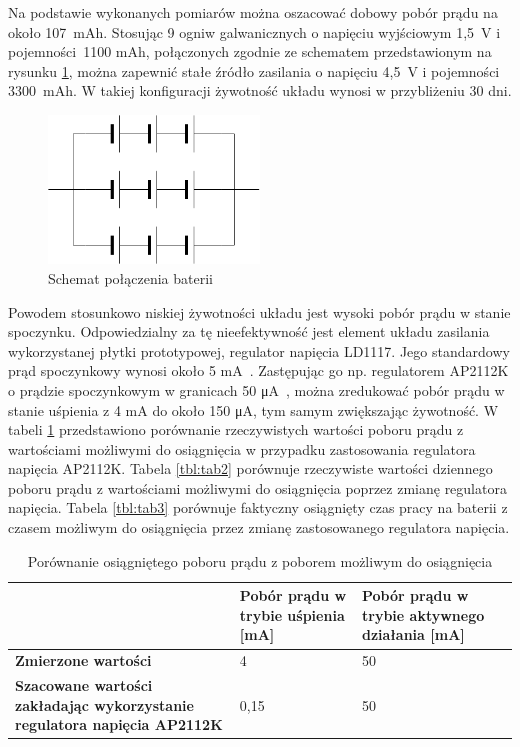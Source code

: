         Na podstawie wykonanych pomiarów można oszacować dobowy pobór prądu na około 107~mAh. Stosując 9 ogniw galwanicznych o napięciu wyjściowym 1,5~V i pojemności~1100 mAh, połączonych zgodnie ze schematem przedstawionym na rysunku \ref{fig:battery_layout}, można zapewnić stałe źródło zasilania o napięciu 4,5~V i pojemności 3300~mAh. W takiej konfiguracji żywotność układu wynosi w przybliżeniu 30 dni.

        \begin{figure}[]
            \centering
            \includegraphics[width=0.5\textwidth]{chapters/images/battery_layout.png}
            \caption{Schemat połączenia baterii}
            \label{fig:battery_layout}
        \end{figure}

        Powodem stosunkowo niskiej żywotności układu jest wysoki pobór prądu w stanie spoczynku. Odpowiedzialny za tę nieefektywność jest element układu zasilania wykorzystanej płytki prototypowej, regulator napięcia LD1117. Jego standardowy prąd spoczynkowy wynosi około 5 mA~\cite{AMS1117-ds}. Zastępując go np. regulatorem AP2112K o prądzie spoczynkowym w granicach 50 μA~\cite{AP2112K-ds}, można zredukować pobór prądu w stanie uśpienia z 4 mA do około 150 μA, tym samym zwiększając żywotność. W tabeli \ref{tbl:tab1} przedstawiono porównanie rzeczywistych wartości poboru prądu z wartościami możliwymi do osiągnięcia w przypadku zastosowania regulatora napięcia AP2112K. Tabela \ref{tbl:tab2} porównuje rzeczywiste wartości dziennego poboru prądu z wartościami możliwymi do osiągnięcia poprzez zmianę regulatora napięcia. Tabela \ref{tbl:tab3} porównuje faktyczny osiągnięty czas pracy na baterii z czasem możliwym do osiągnięcia przez zmianę zastosowanego regulatora napięcia.


        \begin{table}[]
            \caption{Porównanie osiągniętego poboru prądu z poborem możliwym do osiągnięcia}
            \centering
            \begin{tabular}{p{6cm}|p{4cm}|p{4cm} }
                    & \textbf{Pobór prądu w trybie uśpienia [mA]} & \textbf{Pobór prądu w trybie aktywnego działania [mA]} \\ \hline
             \textbf{Zmierzone wartości}
                      & 4 & 50 \\
            \hline
            \textbf{Szacowane wartości zakładając wykorzystanie regulatora napięcia AP2112K} &  0,15 & 50  \\
            \end{tabular}
            \label{tbl:tab1}
            \vspace{10mm}
        \end{table}

